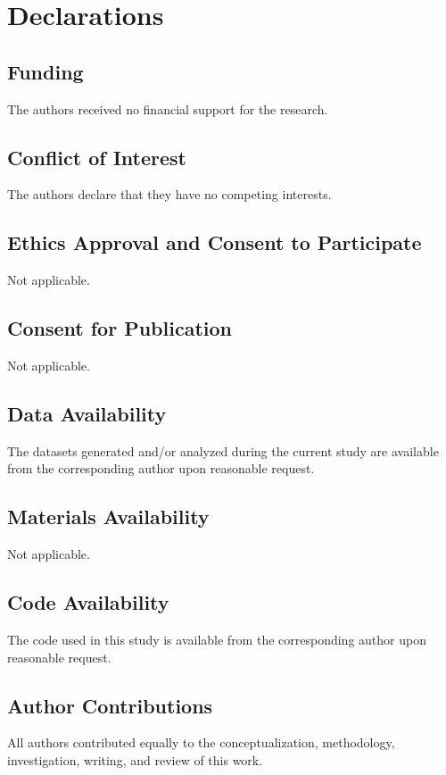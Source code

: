\documentclass[pdflatex,sn-nature]{sn-jnl}%
\theoremstyle{thmstyleone}%
\theoremstyle{thmstyletwo}%
\theoremstyle{thmstylethree}%
\begin{document}

\section*{Declarations}

\subsection*{Funding}
The authors received no financial support for the research.

\subsection*{Conflict of Interest}
The authors declare that they have no competing interests.

\subsection*{Ethics Approval and Consent to Participate}
Not applicable.

\subsection*{Consent for Publication}
Not applicable.

\subsection*{Data Availability}
The datasets generated and/or analyzed during the current study are available from the corresponding author upon reasonable request.

\subsection*{Materials Availability}
Not applicable.

\subsection*{Code Availability}
The code used in this study is available from the corresponding author upon reasonable request.

\subsection*{Author Contributions}
All authors contributed equally to the conceptualization, methodology, investigation, writing, and review of this work.
\end{document}
